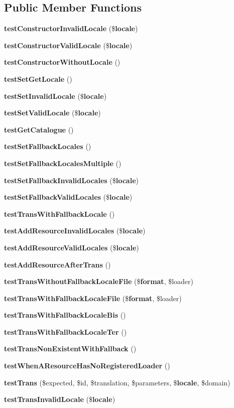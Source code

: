 \subsection*{Public Member Functions}
\begin{DoxyCompactItemize}
\item 
{\bf test\+Constructor\+Invalid\+Locale} (\${\bf locale})
\item 
{\bf test\+Constructor\+Valid\+Locale} (\${\bf locale})
\item 
{\bf test\+Constructor\+Without\+Locale} ()
\item 
{\bf test\+Set\+Get\+Locale} ()
\item 
{\bf test\+Set\+Invalid\+Locale} (\${\bf locale})
\item 
{\bf test\+Set\+Valid\+Locale} (\${\bf locale})
\item 
{\bf test\+Get\+Catalogue} ()
\item 
{\bf test\+Set\+Fallback\+Locales} ()
\item 
{\bf test\+Set\+Fallback\+Locales\+Multiple} ()
\item 
{\bf test\+Set\+Fallback\+Invalid\+Locales} (\${\bf locale})
\item 
{\bf test\+Set\+Fallback\+Valid\+Locales} (\${\bf locale})
\item 
{\bf test\+Trans\+With\+Fallback\+Locale} ()
\item 
{\bf test\+Add\+Resource\+Invalid\+Locales} (\${\bf locale})
\item 
{\bf test\+Add\+Resource\+Valid\+Locales} (\${\bf locale})
\item 
{\bf test\+Add\+Resource\+After\+Trans} ()
\item 
{\bf test\+Trans\+Without\+Fallback\+Locale\+File} (\${\bf format}, \$loader)
\item 
{\bf test\+Trans\+With\+Fallback\+Locale\+File} (\${\bf format}, \$loader)
\item 
{\bf test\+Trans\+With\+Fallback\+Locale\+Bis} ()
\item 
{\bf test\+Trans\+With\+Fallback\+Locale\+Ter} ()
\item 
{\bf test\+Trans\+Non\+Existent\+With\+Fallback} ()
\item 
{\bf test\+When\+A\+Resource\+Has\+No\+Registered\+Loader} ()
\item 
{\bf test\+Trans} (\$expected, \$id, \$translation, \$parameters, \${\bf locale}, \$domain)
\item 
{\bf test\+Trans\+Invalid\+Locale} (\${\bf locale})
\item 

\end{DoxyCompactItemize}
